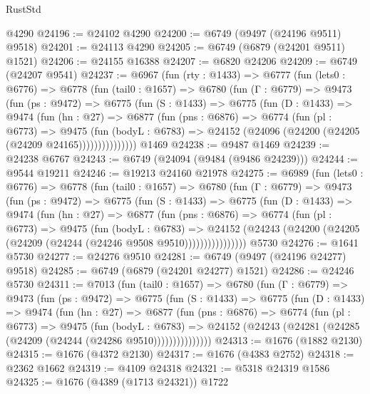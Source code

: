 \begin{lexlean}{RustStd}
\begin{coremodule}
    @4290
@24196 := @24102 @4290
@24200 := @6749 (@9497 (@24196 @9511) @9518)
@24201 := @24113 @4290
@24205 := @6749 (@6879 (@24201 @9511) @1521)
@24206 := @24155 @16388
@24207 := @6820 @24206
@24209 := @6749 (@24207 @9541)
@24237 := @6967
    (fun (rty : @1433) =>
    @6777
      (fun (lets0 : @6776) =>
      @6778
        (fun (tail0 : @1657) =>
        @6780
          (fun (Γ : @6779) =>
          @9473
            (fun (ps : @9472) =>
            @6775
              (fun (S : @1433) =>
              @6775
                (fun (D : @1433) =>
                @9474
                  (fun (hn : @27) =>
                  @6877
                    (fun (pns : @6876) =>
                    @6774
                      (fun (pl : @6773) =>
                      @9475
                        (fun (bodyL : @6783) =>
                        @24152 (@24096 (@24200 (@24205 (@24209 @24165)))))))))))))))
    @1469
@24238 := @9487 @1469
@24239 := @24238 @6767
@24243 := @6749 (@24094 (@9484 (@9486 @24239)))
@24244 := @9544 @19211
@24246 := @19213 @24160 @21978
@24275 := @6989
    (fun (lets0 : @6776) =>
    @6778
      (fun (tail0 : @1657) =>
      @6780
        (fun (Γ : @6779) =>
        @9473
          (fun (ps : @9472) =>
          @6775
            (fun (S : @1433) =>
            @6775
              (fun (D : @1433) =>
              @9474
                (fun (hn : @27) =>
                @6877
                  (fun (pns : @6876) =>
                  @6774
                    (fun (pl : @6773) =>
                    @9475
                      (fun (bodyL : @6783) =>
                      @24152
                        (@24243 (@24200 (@24205 (@24209 (@24244 (@24246 @9508 @9510))))))))))))))))
    @5730
@24276 := @1641 @5730
@24277 := @24276 @9510
@24281 := @6749 (@9497 (@24196 @24277) @9518)
@24285 := @6749 (@6879 (@24201 @24277) @1521)
@24286 := @24246 @5730
@24311 := @7013
    (fun (tail0 : @1657) =>
    @6780
      (fun (Γ : @6779) =>
      @9473
        (fun (ps : @9472) =>
        @6775
          (fun (S : @1433) =>
          @6775
            (fun (D : @1433) =>
            @9474
              (fun (hn : @27) =>
              @6877
                (fun (pns : @6876) =>
                @6774
                  (fun (pl : @6773) =>
                  @9475
                    (fun (bodyL : @6783) =>
                    @24152 (@24243 (@24281 (@24285 (@24209 (@24244 (@24286 @9510)))))))))))))))
@24313 := @1676 (@1882 @2130)
@24315 := @1676 (@4372 @2130)
@24317 := @1676 (@4383 @2752)
@24318 := @2362 @1662
@24319 := @4109 @24318
@24321 := @5318 @24319 @1586
@24325 := @1676 (@4389 (@1713 @24321)) @1722

\end{coremodule}
\end{lexlean}
